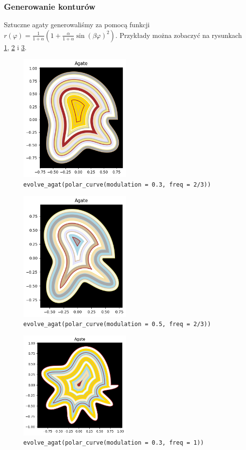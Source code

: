 \documentclass{article}
\begin{document}
\subsubsection{Generowanie konturów}
Sztuczne agaty generowaliśmy za pomocą funkcji $r(\varphi)=\frac{1}{1+\alpha} (1 + \frac{\alpha}{1+\alpha}\sin(\beta\varphi)^2)$. Przykłady można zobaczyć na rysunkach \ref{wygenerowany1}, \ref{wygenerowany2} i \ref{wygenerowany3}.
\begin{figure}[H]
\caption{\texttt{evolve\_agat(polar\_curve(modulation = 0.3, freq = 2/3))}}
\label{wygenerowany1}
\centering
\includegraphics[width=0.5\textwidth]{obrazy/wygenerowany1.png}
\end{figure}
\begin{figure}[H]
\caption{\texttt{evolve\_agat(polar\_curve(modulation = 0.5, freq = 2/3))}}
\label{wygenerowany2}
\centering
\includegraphics[width=0.5\textwidth]{obrazy/wygenerowany2.png}
\end{figure}
\begin{figure}[H]
\caption{\texttt{evolve\_agat(polar\_curve(modulation = 0.3, freq = 1))}}
\label{wygenerowany3}
\centering
\includegraphics[width=0.5\textwidth]{obrazy/wygenerowany3.png}
\end{figure}
\end{document}
